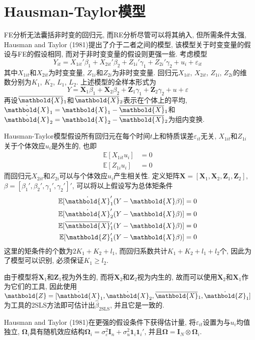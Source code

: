 \documentclass[cn, 12pt, math=mtpro2, bibstyle=apa, blue, twocol]{elegantbook}
\newcommand{\E}{\mathbb{E}}
\newcommand{\X}{\mathbold{X}}
\newcommand{\Z}{\mathbold{Z}}
\newcommand{\hb}{\hat{\beta}}
\newcommand{\BO}{\mathbold{\Omega}}
\newcommand{\overbar}[1]{\mkern 1.5mu\overline{\mkern-1.5mu#1\mkern-1.5mu}\mkern 1.5mu}
\begin{document}
\section{Hausman-Taylor模型}
FE分析无法囊括非时变的回归元, 而RE分析尽管可以将其纳入, 但所需条件太强, Hausman and Taylor (1981)提出了介于二者之间的模型, 该模型关于时变变量的假设与FE的假设相同, 而对于非时变变量的假设则更强一些. 考虑模型
$$Y_{it}=X_{1it}'\beta_1+X_{2it}'\beta_2+Z_{1i}'\gamma_1+Z_{2i}'\gamma_2+u_i+\varepsilon_{it}$$
其中$X_{1it}$和$X_{2it}$为时变变量, $Z_{1i}$和$Z_{2i}$为非时变变量. 回归元$X_{1it}$, $X_{2it}$, $Z_{1i}$, $Z_{2i}$的维数分别为$K_1$, $K_2$, $L_1$, $L_2$. 上述模型的全样本形式为
\begin{equation}\label{eq8.43}
  Y=\X_1\beta_1+\X_2\beta_2+\Z_1\gamma_1+\Z_2\gamma_2+u+\varepsilon
\end{equation}
再设$\overbar{\X}_1$和$\overbar{\X}_2$表示在个体上的平均, $\dot{\X}_1=\X_1-\overbar{\X}_1$和$\dot{\X}_2=\X_2-\overbar{\X}_2$为组内变换.

Hausman-Taylor模型假设所有回归元在每个时间$t$上和特质误差$\varepsilon_{it}$无关, $X_{1it}$和$Z_{1i}$关于个体效应$u_i$是外生的, 也即
\begin{align*}
\E[X_{1it}u_i]&=0 \\
\E[Z_{1i}u_i]&=0
\end{align*}
而回归元$X_{2it}$和$Z_{2i}$可以与个体效应$u_i$产生相关性. 定义矩阵$\X=[\X_1,\X_2,\Z_1,\Z_2]$, $\beta=[\beta_1',\beta_2',\gamma_1',\gamma_2']'$, 可以将以上假设写为总体矩条件
\begin{align*}
\E[\dot{\X}_1'(Y-\X\beta)]&=0 \\
\E[\dot{\X}_2'(Y-\X\beta)]&=0 \\
\E[\overbar{\X}_1'(Y-\X\beta)]&=0 \\
\E[\Z_1'(Y-\X\beta)]&=0
\end{align*}
这里的矩条件的个数为$2K_1+K_2+l_1$, 而回归系数共计$K_1+K_2+l_1+l_2$个, 因此为了模型可以识别, 必须保证$K_1\geq l_2$.

由于模型将$\X_1$和$\Z_1$视为外生的, 而将$\X_2$和$\Z_2$视为内生的, 故而可以使用$\dot{\X}_2$和$\X_1$作为它们的工具, 因此使用$\Z=[\dot{\X}_1,\dot{\X}_2,\overbar{\X}_1,\dot{\Z}_1]$为工具的2SLS方法即可估计出$\hb_{\text{2SLS}}$, 并且它是一致的.

Hausman and Taylor (1981)在更强的假设条件下获得估计量, 将$\varepsilon_{it}$设置为与$u_i$均值独立, $\BO_i$具有随机效应结构$\BO_i=\sigma_\varepsilon^2\mathbf{I}_n+\sigma_u^2\mathbf{1}_i\mathbf{1}_i'$, 并且$\BO=\mathbold{I}_N\otimes \BO_i$.
\end{document}
